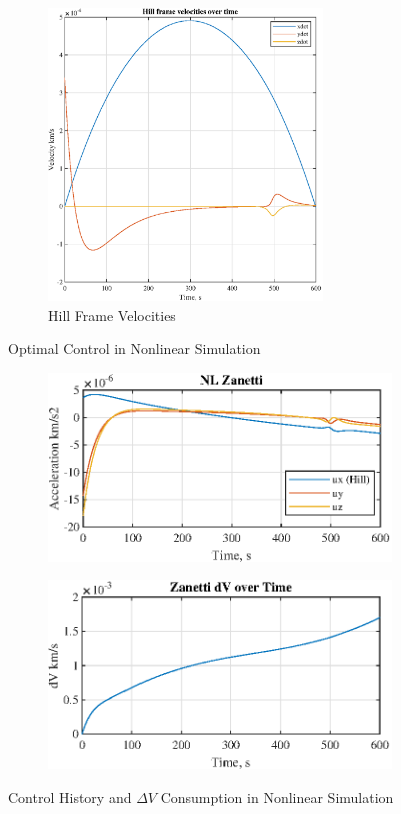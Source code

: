 \documentclass[conf]{new-aiaa}
\begin{document}
\begin{singlespace}
\begin{figure}[htpb!]
\begin{subfigure}{.5\textwidth}
  \includegraphics[width=0.8\textwidth]{figures/vels_N.eps}
  \caption{Hill Frame Velocities}
  \label{fig:offset}
\end{subfigure}
\label{fig:offsets}
\caption{Optimal Control in Nonlinear Simulation}
\end{figure}
\begin{figure}[htpb!]
\begin{subfigure}{.5\textwidth}
  \centering
  \includegraphics[width=.8\linewidth]{figures/controls_NL.eps}
\end{subfigure}%
\begin{subfigure}{.5\textwidth}
  \centering
  \includegraphics[width=.8\linewidth]{figures/dV_NL.eps}
\end{subfigure}
\caption{Control History and $\Delta V$ Consumption in Nonlinear Simulation}
\label{fig:compsnl}
\end{figure}





\end{singlespace}
\end{document}
